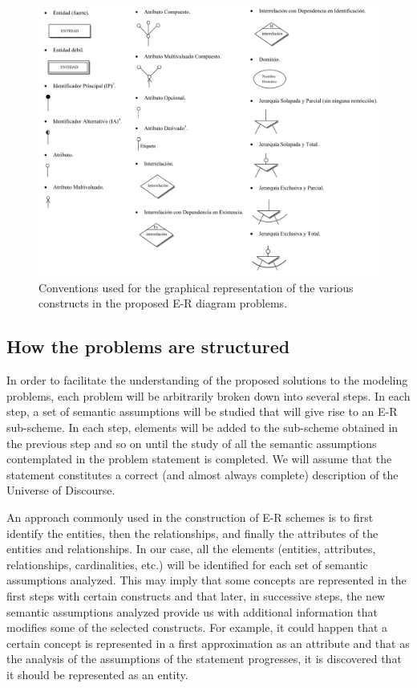 \documentclass{article}
\begin{document}
\begin{figure}
    \centering
    \includegraphics[width=\textwidth]{figures/erd_notation}
    \caption{Conventions used for the graphical representation of the various constructs in the proposed E-R diagram problems.}
    \label{fig:notation}
\end{figure}

\subsection{How the problems are structured}

In order to facilitate the understanding of the proposed solutions to the modeling problems, each problem will be arbitrarily broken down into several steps.  In each step, a set of semantic assumptions will be studied that will give rise to an E-R sub-scheme.  In each step, elements will be added to the sub-scheme obtained in the previous step and so on until the study of all the semantic assumptions contemplated in the problem statement is completed.  We will assume that the statement constitutes a correct (and almost always complete) description of the Universe of Discourse.

An approach commonly used in the construction of E-R schemes is to first identify the entities, then the relationships, and finally the attributes of the entities and relationships.  In our case, all the elements (entities, attributes, relationships, cardinalities, etc.) will be identified for each set of semantic assumptions analyzed.  This may imply that some concepts are represented in the first steps with certain constructs and that later, in successive steps, the new semantic assumptions analyzed provide us with additional information that modifies some of the selected constructs.  For example, it could happen that a certain concept is represented in a first approximation as an attribute and that as the analysis of the assumptions of the statement progresses, it is discovered that it should be represented as an entity.
\end{document}
